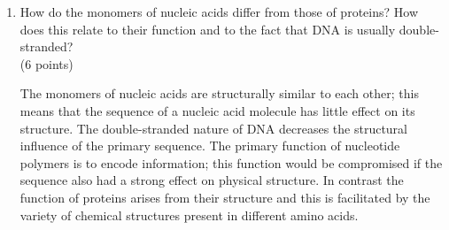 \documentclass[11pt]{article}
\begin{document}
\begin{enumerate}
\item How do the monomers of nucleic acids differ from those of proteins? How
  does this relate to their function and to the fact that DNA is usually double-stranded?\\
(6 points)

\begin{Notes}
  The monomers of nucleic acids are structurally similar to each other; this
  means that the sequence of a nucleic acid molecule has little effect on its
  structure. The double-stranded nature of DNA decreases the structural
  influence of the primary sequence. The primary function of nucleotide
  polymers is to encode information; this function would be compromised if the
  sequence also had a strong effect on physical structure. In contrast the
  function of proteins arises from their structure and this is facilitated by
  the variety of chemical structures present in different amino acids.
\end{Notes}
\end{enumerate}
\end{document}
